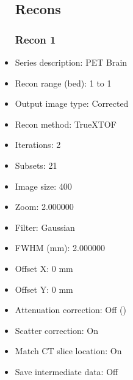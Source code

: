 \documentclass[12pt]{article}
\begin{document}
\begin{itemize}
\subsection{Recons}
\subsubsection{Recon 1}
\item Series description: PET Brain
\item Recon range (bed): 1 to 1
\item Output image type: Corrected
\item Recon method: TrueXTOF
\item Iterations: 2
\item Subsets: 21
\item Image size: 400
\item Zoom: 2.000000
\item Filter: Gaussian
\item FWHM (mm): 2.000000
\item Offset X: 0 mm
\item Offset Y: 0 mm
\item Attenuation correction: Off ()
\item Scatter correction: On
\item Match CT slice location: On
\item Save intermediate data: Off
\end{itemize}
\end{document}
